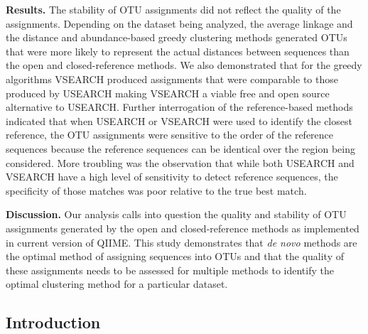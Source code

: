\documentclass[11pt,]{article}
\begin{document}
\textbf{Results.} The stability of OTU assignments did not reflect the
quality of the assignments. Depending on the dataset being analyzed, the
average linkage and the distance and abundance-based greedy clustering
methods generated OTUs that were more likely to represent the actual
distances between sequences than the open and closed-reference methods.
We also demonstrated that for the greedy algorithms VSEARCH produced
assignments that were comparable to those produced by USEARCH making
VSEARCH a viable free and open source alternative to USEARCH. Further
interrogation of the reference-based methods indicated that when USEARCH
or VSEARCH were used to identify the closest reference, the OTU
assignments were sensitive to the order of the reference sequences
because the reference sequences can be identical over the region being
considered. More troubling was the observation that while both USEARCH
and VSEARCH have a high level of sensitivity to detect reference
sequences, the specificity of those matches was poor relative to the
true best match.

\textbf{Discussion.} Our analysis calls into question the quality and
stability of OTU assignments generated by the open and closed-reference
methods as implemented in current version of QIIME. This study
demonstrates that \emph{de novo} methods are the optimal method of
assigning sequences into OTUs and that the quality of these assignments
needs to be assessed for multiple methods to identify the optimal
clustering method for a particular dataset.

\newpage

\subsection{Introduction}\label{introduction}
\end{document}
